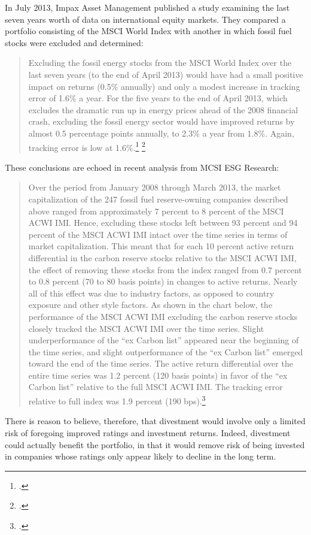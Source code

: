 In July 2013, Impax Asset Management published a study examining the last seven years worth of data on international equity markets.
They compared a portfolio consisting of the MSCI World Index with another in which fossil fuel stocks were excluded and determined:
\begin{quote}
Excluding the fossil energy stocks from the MSCI World Index over the last seven years (to the end of April 2013) would have had a small positive impact on returns (0.5\% annually) and only a modest increase in tracking error of 1.6\% a year. For the five years to the end of April 2013, which excludes the dramatic run up in energy prices ahead of the 2008 financial crash, excluding the fossil energy sector would have improved returns by almost 0.5 percentage points annually, to 2.3\% a year from 1.8\%. Again, tracking error is low at 1.6\%.\footcite[][p. 5]{ImpaxBeyondFF} \footcite[See also: ][]{ImpaxEnergyCollective}
\end{quote}
These conclusions are echoed in recent analysis from MCSI ESG Research:
\begin{quote}
Over the period from January 2008 through March 2013, the market capitalization of the 247 fossil fuel reserve-owning companies described above ranged from approximately 7 percent to 8 percent of the MSCI ACWI IMI. Hence, excluding these stocks left between 93 percent and 94 percent of the MSCI ACWI IMI intact over the time series in terms of market capitalization. This meant that for each 10 percent active return differential in the carbon reserve stocks relative to the MSCI ACWI IMI, the effect of removing these stocks from the index ranged from 0.7 percent to 0.8 percent (70 to 80 basis points) in changes to active returns. Nearly all of this effect was due to industry factors, as opposed to country exposure and other style factors. As shown in the chart below, the performance of the MSCI ACWI IMI excluding the carbon reserve stocks closely tracked the MSCI ACWI IMI over the time series. Slight underperformance of the ``ex Carbon list'' appeared near the beginning of the time series, and slight outperformance of the ``ex Carbon list'' emerged toward the end of the time series. The active return differential over the entire time series was 1.2 percent (120 basis points) in favor of the ``ex Carbon list'' relative to the full MSCI ACWI IMI. The tracking error relative to full index was 1.9 percent (190 bps).\footcite[][p. 5]{MCSIFFP}
\end{quote}
There is reason to believe, therefore, that divestment would involve only a limited risk of foregoing improved ratings and investment returns.
Indeed, divestment could actually benefit the portfolio, in that it would remove risk of being invested in companies whose ratings only appear likely to decline in the long term.



